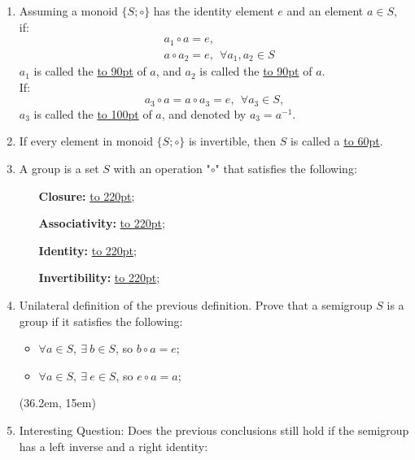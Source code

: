 \documentclass[12pt]{scrartcl}
\begin{document}
{{\begin{enumerate}[label=(\alph*)]
	\item 
	Assuming a monoid $\{S; \circ\}$ has the identity element $e$ and an element $a \in S$, if:
	\begin{align*}
	&a_1 \circ a = e,\\
	&a \circ a_2 = e, ~~\forall a_1, a_2 \in S
	\end{align*}	
	$a_1$ is called the \underline{\hbox to 90pt{}} of $a$, and $a_2$ is called the \underline{\hbox to 90pt{}} of $a$.\\

	If:
	$$a_3 \circ a = a \circ a_3 = e, ~~\forall a_3 \in S,$$
	$a_3$ is called the \underline{\hbox to 100pt{}} of $a$, and denoted by $a_3 = a^{-1}.$

	\item If every element in monoid $\{S; \circ\}$ is invertible, then $S$ is called a \underline{\hbox to 60pt{}}.

\newpage

	\item A group is a set $S$ with an operation "$\circ$" that satisfies the following:
		
		\begin{itemize}[leftmargin=100pt]
		\item[\textbf{Closure: }] \underline{\hbox to 220pt{}}; 
		\item[\textbf{Associativity: }] \underline{\hbox to 220pt{}};
		\item[\textbf{Identity: }] \underline{\hbox to 220pt{}};
		\item[\textbf{Invertibility: }] \underline{\hbox to 220pt{}}; \\
		\end{itemize} 


	\item Unilateral definition of the previous definition. Prove that a semigroup $S$ is a group if it satisfies the following: 
		
		\begin{itemize}[leftmargin=50pt]
		\item $\forall a \in S, ~ \exists ~ b \in S$, so $b \circ a = e$;
		\item $\forall a \in S, ~ \exists ~ e \in S$, so $e \circ a = a$; \\
		\end{itemize} 
	
		\framebox(36.2em, 15em){}


	\item Interesting Question: Does the previous conclusions still hold if the semigroup has a left inverse and a right identity:


\end{enumerate}}}
\end{document}
